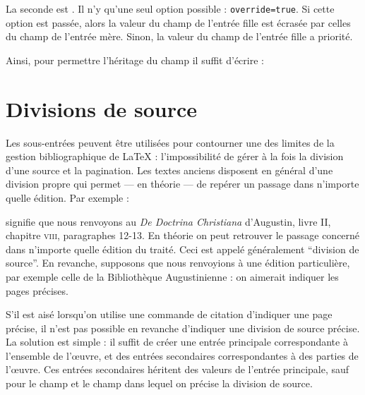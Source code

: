 La seconde  est 
.
Il n'y qu'une seul option possible : \verb|override=true|. Si cette option est passée, alors la valeur du champ de l'entrée fille est écrasée par celles du champ de l'entrée mère. Sinon, la valeur  du champ de l'entrée fille a priorité.

Ainsi, pour permettre l'héritage du  champ  il suffit d'écrire :

\begin{latexcode}
\end{latexcode}

\section{Divisions de source}\label{divisionsource}

Les sous-entrées peuvent être utilisées pour contourner une des limites de la gestion bibliographique de \LaTeX{} : l'impossibilité de gérer à la fois  la division d'une source et la pagination. Les textes anciens disposent en général d'une division propre qui permet --- en théorie ---  de repérer un passage dans n'importe quelle édition. Par exemple :

\begin{quotation}
\cite{DoctrineChretienneDivision}
\end{quotation}

signifie que nous renvoyons au \emph{De Doctrina Christiana} d'Augustin, livre II, chapitre \textsc{viii}, paragraphes 12-13. En théorie on peut retrouver le passage concerné dans n'importe quelle édition du traité. Ceci est appelé généralement \enquote{division de source}.
En revanche, supposons que nous renvoyions à une édition particulière, par exemple celle de la Bibliothèque Augustinienne : on aimerait indiquer les pages précises.

\begin{quotation}
\cite{DeDoctChrIIviii18-20}
\end{quotation}

S'il est aisé lorsqu'on utilise une commande de citation d'indiquer une page précise, il n'est pas possible en revanche d'indiquer une division de source précise. La solution est  simple : il suffit de créer une entrée principale correspondante à l'ensemble de l'œuvre, et des entrées secondaires correspondantes à des parties de l'œuvre. Ces entrées secondaires héritent des valeurs de l'entrée principale, sauf pour le champ  et le champ  dans lequel on précise la division de source.

